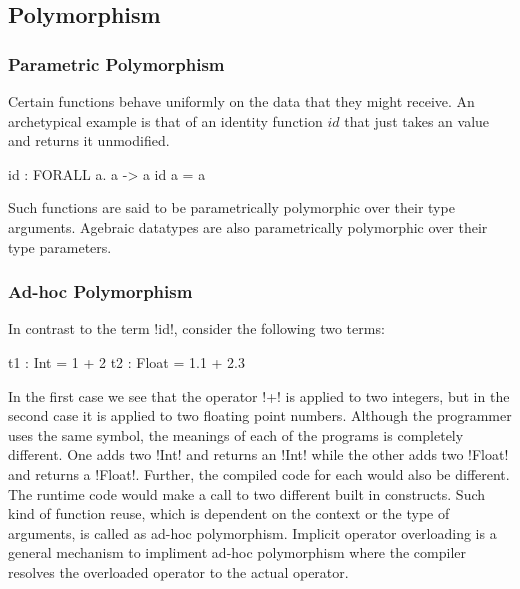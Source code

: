 \documentclass[manuscript,screen,nonacm]{acmart}
\begin{document}


\subsection{Polymorphism}
\subsubsection{Parametric Polymorphism}
Certain functions behave uniformly on the data that they might receive. An archetypical example is that of an identity function $id$ that just takes an value and returns it unmodified.

\begin{CenteredBox}
  \begin{code}
    id : FORALL a. a -> a
    id a = a
  \end{code}
\end{CenteredBox}
Such functions are said to be parametrically polymorphic over their type arguments\cite{strachey_fundamental_2000}.
Agebraic datatypes are also parametrically polymorphic over their type parameters.

\subsubsection{Ad-hoc Polymorphism}
In contrast to the term !id!, consider the following two terms:

\begin{CenteredBox}
  \begin{code}
    t1 : Int = 1 + 2
    t2 : Float = 1.1 + 2.3
  \end{code}
\end{CenteredBox}
In the first case we see that the operator !+! is applied to two integers, but in the second case it is applied to two floating point numbers. Although the programmer uses the same symbol, the meanings of each of the programs is completely different. One adds two !Int! and returns an !Int! while the other adds two !Float! and returns a !Float!. Further, the compiled code for each would also be different. The runtime code would make a call to two different built in constructs. Such kind of function reuse, which is dependent on the context or the type of arguments, is called as ad-hoc polymorphism\cite{strachey_fundamental_2000}. Implicit operator overloading is a general mechanism to impliment ad-hoc polymorphism where the compiler resolves the overloaded operator to the actual operator.
\end{document}
